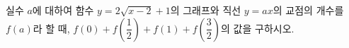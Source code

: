 \hspace*{2mm}\begin{minipage}[t]{\dimexpr\linewidth-2mm\relax}\vspace{0pt}
실수 $a$에 대하여 함수 $y=2\sqrt{x-2}+1$의 그래프와 직선 $y=ax$의 교점의 개수를 $f(a)$라 할 때, $f(0)+f\!\left(\dfrac{1}{2}\right)+f(1)+f\!\left(\dfrac{3}{2}\right)$의 값을 구하시오.\end{minipage}
